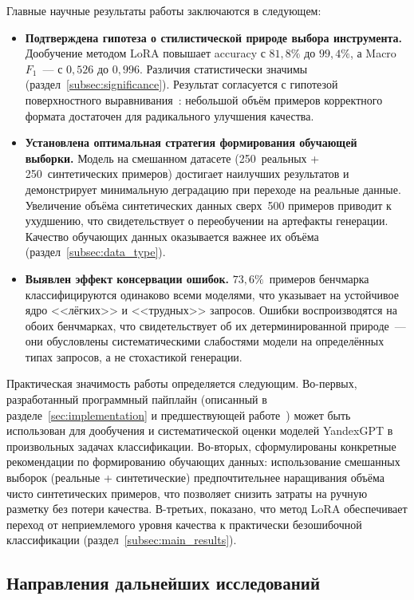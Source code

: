 Главные научные результаты работы заключаются в следующем:
\begin{itemize}
    \item \textbf{Подтверждена гипотеза о стилистической природе выбора инструмента.} Дообучение методом LoRA повышает accuracy с $81{,}8\%$ до $99{,}4\%$, а Macro~$F_1$~--- с $0{,}526$ до $0{,}996$. Различия статистически значимы (раздел~\ref{subsec:significance}). Результат согласуется с гипотезой поверхностного выравнивания~\cite{zhou2023lima}: небольшой объём примеров корректного формата достаточен для радикального улучшения качества.

    \item \textbf{Установлена оптимальная стратегия формирования обучающей выборки.} Модель на смешанном датасете (250~реальных + 250~синтетических примеров) достигает наилучших результатов и демонстрирует минимальную деградацию при переходе на реальные данные. Увеличение объёма синтетических данных сверх~500 примеров приводит к ухудшению, что свидетельствует о переобучении на артефакты генерации. Качество обучающих данных оказывается важнее их объёма (раздел~\ref{subsec:data_type}).

    \item \textbf{Выявлен эффект консервации ошибок.} $73{,}6\%$~примеров бенчмарка классифицируются одинаково всеми моделями, что указывает на устойчивое ядро <<лёгких>> и <<трудных>> запросов. Ошибки воспроизводятся на обоих бенчмарках, что свидетельствует об их детерминированной природе~--- они обусловлены систематическими слабостями модели на определённых типах запросов, а не стохастикой генерации.
\end{itemize}

Практическая значимость работы определяется следующим. Во-первых, разработанный программный пайплайн (описанный в разделе~\ref{sec:implementation} и предшествующей работе~\cite{goroshko2025otchet}) может быть использован для дообучения и систематической оценки моделей YandexGPT в произвольных задачах классификации. Во-вторых, сформулированы конкретные рекомендации по формированию обучающих данных: использование смешанных выборок (реальные + синтетические) предпочтительнее наращивания объёма чисто синтетических примеров, что позволяет снизить затраты на ручную разметку без потери качества. В-третьих, показано, что метод LoRA обеспечивает переход от неприемлемого уровня качества к практически безошибочной классификации (раздел~\ref{subsec:main_results}).

\subsection{Направления дальнейших исследований}

